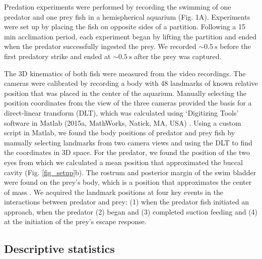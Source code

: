 \documentclass[]{rsos}%
\begin{document}
Predation experiments were performed by recording the swimming of one predator and one prey fish in a hemispherical aquarium (Fig. 1A). 
Experiments were set up by placing the fish on opposite sides of a partition.
Following a 15 min acclimation period, each experiment began by lifting the partition and ended when the predator successfully ingested the prey.
We recorded $\sim \SI{0.5}{\s}$ before the first predatory strike and ended at $\sim \SI{0.5}{\s}$  after the prey was captured.

The 3D kinematics of both fish were measured from the video recordings. 
The cameras were calibrated by recording a body with 48 landmarks of known relative position that was placed in the center of the aquarium.
Manually selecting the position coordinates from the view of the three cameras provided the basis for a direct-linear transform (DLT), which was calculated using  `Digitizing Tools' software in Matlab (2015a, MathWorks, Natick, MA, USA) \cite{Hedrick:2008wz}.
Using a custom script in Matlab, we found the body positions of predator and prey fish by manually selecting landmarks from two camera views and using the DLT to find the coordinates in 3D space.
For the predator, we found the position of the two eyes from which we calculated a mean position that approximated the buccal cavity (Fig. \ref{fig_setup}b).
The rostrum and posterior margin of the swim bladder were found on the prey's body, which is a position that approximates the center of mass \cite{Stewart:2010ig}.
We acquired the landmark positions at four key events in the interactions between predator and prey: (1) when the predator fish initiated an approach, when the predator (2) began and (3) completed suction feeding and (4) at the initiation of the prey's escape response.


\subsection{Descriptive statistics}
\end{document}
